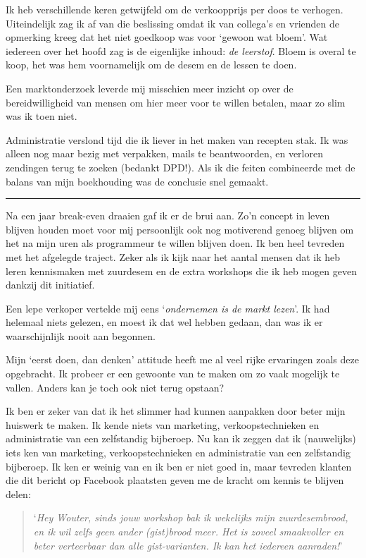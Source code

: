 \documentclass[
  11pt,
  dutch,
]{memoir}
\begin{document}
Ik heb verschillende keren getwijfeld om de verkoopprijs per doos te
verhogen. Uiteindelijk zag ik af van die beslissing omdat ik van
collega's en vrienden de opmerking kreeg dat het niet goedkoop was voor
`gewoon wat bloem'. Wat iedereen over het hoofd zag is de eigenlijke
inhoud: \emph{de leerstof}. Bloem is overal te koop, het was hem
voornamelijk om de desem en de lessen te doen.

Een marktonderzoek leverde mij misschien meer inzicht op over de
bereidwilligheid van mensen om hier meer voor te willen betalen, maar zo
slim was ik toen niet.

Administratie verslond tijd die ik liever in het maken van recepten
stak. Ik was alleen nog maar bezig met verpakken, mails te beantwoorden,
en verloren zendingen terug te zoeken (bedankt DPD!). Als ik die feiten
combineerde met de balans van mijn boekhouding was de conclusie snel
gemaakt.

\pfbreak

Na een jaar break-even draaien gaf ik er de brui aan. Zo'n concept in
leven blijven houden moet voor mij persoonlijk ook nog motiverend genoeg
blijven om het na mijn uren als programmeur te willen blijven doen. Ik
ben heel tevreden met het afgelegde traject. Zeker als ik kijk naar het
aantal mensen dat ik heb leren kennismaken met zuurdesem en de extra
workshops die ik heb mogen geven dankzij dit initiatief.

Een lepe verkoper vertelde mij eens `\emph{ondernemen is de markt
lezen}'. Ik had helemaal niets gelezen, en moest ik dat wel hebben
gedaan, dan was ik er waarschijnlijk nooit aan begonnen.

Mijn `eerst doen, dan denken' attitude heeft me al veel rijke ervaringen
zoals deze opgebracht. Ik probeer er een gewoonte van te maken om zo
vaak mogelijk te vallen. Anders kan je toch ook niet terug opstaan?

Ik ben er zeker van dat ik het slimmer had kunnen aanpakken door beter
mijn huiswerk te maken. Ik kende niets van marketing, verkoopstechnieken
en administratie van een zelfstandig bijberoep. Nu kan ik zeggen dat ik
(nauwelijks) iets ken van marketing, verkoopstechnieken en administratie
van een zelfstandig bijberoep. Ik ken er weinig van en ik ben er niet
goed in, maar tevreden klanten die dit bericht op Facebook plaatsten
geven me de kracht om kennis te blijven delen:

\begin{quote}
`\emph{Hey Wouter, sinds jouw workshop bak ik wekelijks mijn
zuurdesembrood, en ik wil zelfs geen ander (gist)brood meer. Het is
zoveel smaakvoller en beter verteerbaar dan alle gist-varianten. Ik kan
het iedereen aanraden!}'
\end{quote}
\end{document}
